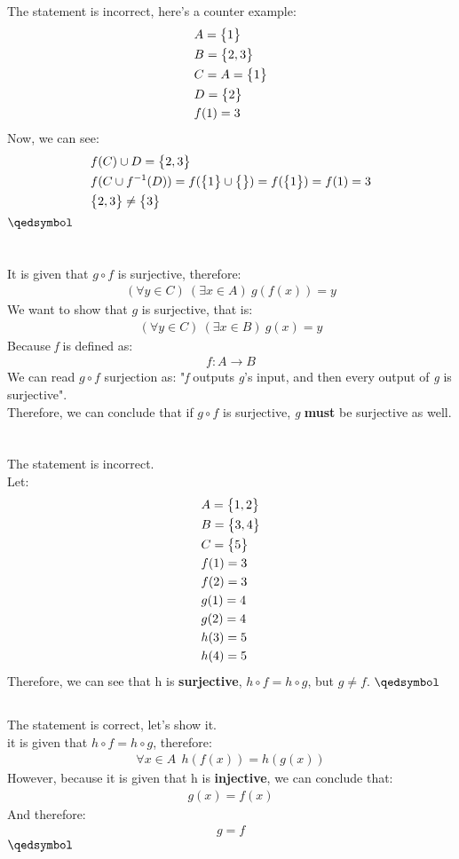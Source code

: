 \documentclass[a4paper, 12pt]{article}
\newcommand{\sub}[1]{\subsection{\underline{#1}}}
\newcommand{\eq}[1]{\begin{align*}#1\end{align*}}
\newcommand{\set}[1]{\big{\{} #1 \big{\}}}
\renewcommand{\qed}{\hfill\(\qedsymbol\)}
\begin{document}
\sub{}
The statement is incorrect, here's a counter example:
\eq{
    &A=\set{1}\\
    &B=\set{2,3}\\
    &C=A=\set{1}\\
    &D=\set{2}\\
    &f(1)=3\\
}
Now, we can see:
\eq{
    &f(C)\cup{D}=\set{2,3}\\
    &f(C\cup{f^{-1}(D))}=f(\set{1}\cup\set{})=f(\set{1})=f(1)=3\\
    &\set{2,3}\neq\set{3}
}
\qed
\pagebreak

\section{}
It is given that $g\circ{f}$ is surjective, therefore:
\eq{
    (\forall{y}\in{C})~(\exists{x}\in{A})~g(f(x))=y
}
We want to show that $g$ is surjective, that is:
\eq{
    (\forall{y}\in{C})~(\exists{x}\in{B})~g(x)=y
}
Because \textit{f} is defined as:
\eq{
    f:A\longrightarrow{B}
}
We can read $g\circ{f}$ surjection as: "\textit{f} outputs \textit{g}'s input, and then every output of \textit{g} is surjective".\\
Therefore, we can conclude that if $g\circ{f}$ is surjective, \textit{g} \textbf{must} be surjective as well.

\section{}
\sub{}
The statement is incorrect.\\
Let:
\eq{
    &A=\set{1,2}\\
    &B=\set{3,4}\\
    &C=\set{5}\\
    &f(1)=3\\
    &f(2)=3\\
    &g(1)=4\\
    &g(2)=4\\
    &h(3)=5\\
    &h(4)=5
}
Therefore, we can see that h is \textbf{surjective}, $h\circ{f}=h\circ{g}$, but $g\neq{f}$.
\qed
\sub{}
The statement is correct, let's show it.\\
it is given that $h\circ{f}=h\circ{g}$, therefore:
\eq{
    \forall{x}\in{A}~~h(f(x))=h(g(x))
}
However, because it is given that h is \textbf{injective}, we can conclude that:
\eq{g(x)=f(x)}
And therefore:
\eq{g=f}
\qed

\end{document}
